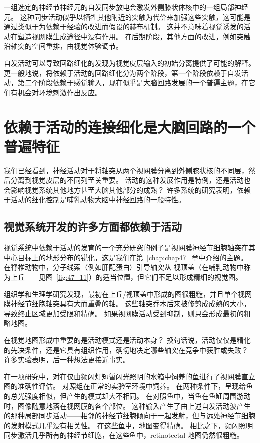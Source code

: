 一组选定的神经节神经元的自发同步放电会激发外侧膝状体核中的一组局部神经元。
这种同步活动似乎以牺牲其他附近的突触为代价来加强这些突触，这可能是通过类似于为依赖于经验的改进而假设的赫布机制。
这并不意味着视觉诱发的活动在塑造视网膜生成途径中没有作用。
在后期阶段，其他方面的改进，例如突触沿轴突的空间重排，由视觉体验调节。


自发活动可以导致回路细化的发现为视觉皮层输入的初始分离提供了可能的解释。
更一般地说，将依赖于活动的回路细化分为两个阶段，第一个阶段依赖于自发活动，第二个阶段依赖于感觉输入，现在似乎是大脑回路发展的一个普遍主题，在它们有机会对环境刺激作出反应。



\section{依赖于活动的连接细化是大脑回路的一个普遍特征}

我们已经看到，神经活动对于将轴突从两个视网膜分离到外侧膝状核的不同层，然后分离到视觉皮层的不同列至关重要。
活动的这种发展作用是特例，还是活动也会影响视觉系统其他地方甚至大脑其他部分的成熟？
许多系统的研究表明，依赖于活动的细化控制是哺乳动物大脑中神经回路的一般特性。



\subsection{视觉系统开发的许多方面都依赖于活动}

视觉系统中依赖于活动的发育的一个充分研究的例子是视网膜神经节细胞轴突在其中心目标上的地形分布的锐化，这是我们在第~\ref{chap:chap47}~章中介绍的主题。
在脊椎动物中，分子线索（例如肝配蛋白）引导轴突从 视顶盖（在哺乳动物中称为上丘——见图~\ref{fig:47_11}）的适当位置，但它们不足以形成精细的视觉图。


组织学和生理学研究发现，最初在上丘/视顶盖中形成的图很粗糙，并且单个视网膜神经节细胞轴突具有大而重叠的轴。
这些轴突乔木后来被修剪成成熟的大小，导致终止区域更加受限和精确。
如果视网膜活动受到抑制，则只会形成最初的粗略地图。


在视觉地图形成中重要的是活动模式还是活动本身？
换句话说，活动仅仅是精化的先决条件，还是它具有组织作用，确切地决定哪些轴突在竞争中获胜或失败？
许多实验表明，后一种想法更接近事实。


在一项研究中，对在仅由频闪灯短暂闪光照明的水箱中饲养的鱼进行了视网膜直立图的准确性评估。
对照组在正常的实验室环境中饲养。
在两种条件下，呈现给鱼的总光强度相似，但产生的模式却大不相同。
在对照鱼中，当鱼在鱼缸周围游动时，图像随意地落在视网膜的各个部位。
这种输入产生了由上述自发活动波产生的那种局部同步活动——相邻的神经节细胞倾向于一起发射，但与远处神经节细胞的发射模式几乎没有相关性。
在这些鱼中，地图变得精确。
相比之下，频闪照明同步激活几乎所有的神经节细胞，在这些鱼中，retinotectal 地图仍然很粗糙。


